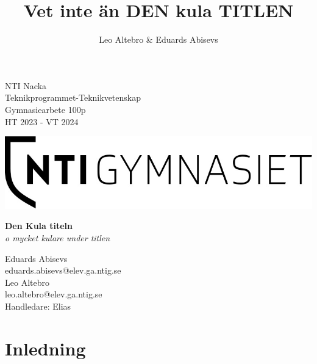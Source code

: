 \documentclass[a4paper]{article}
\title{Vet inte än DEN kula TITLEN}
\author{Leo Altebro & Eduards Abisevs}
\date{ }
\begin{document}
\begin{titlepage}
	\begin{minipage}[t]{0.5\textwidth}
        \raggedright
        NTI Nacka \\
        Teknikprogrammet-Teknikvetenskap \\
        Gymnasiearbete 100p \\
        HT 2023 - VT 2024
    \end{minipage}
    \hfill
    \begin{minipage}[t]{0.5\textwidth}
        \raggedleft
        \includegraphics[width=\linewidth]{images/logo.jpg} %
    \end{minipage}

    \vspace*{\fill} %

    \begin{center}
        \Large\textbf{Den Kula titeln}\\
        \large\textit{o mycket kulare under titlen}
    \end{center}

    \vspace*{\fill} %

    \begin{minipage}[b]{0.48\textwidth}
        \raggedright
        Eduards Abisevs\\
        eduards.abisevs@elev.ga.ntig.se\\
        Leo Altebro\\
        leo.altebro@elev.ga.ntig.se\\
        Handledare: Elias
    \end{minipage}
\end{titlepage}


\tableofcontents
\newpage

\section{Inledning}
\end{document}
